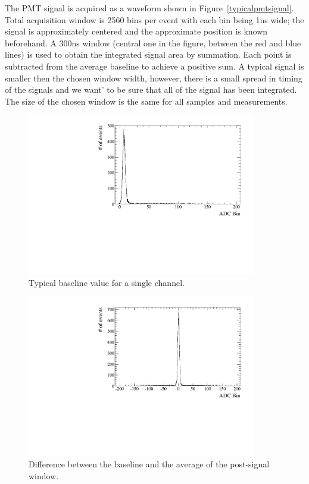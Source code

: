 \documentclass[preprint,12pt]{elsarticle}
\begin{document}
The PMT signal is acquired as a waveform shown in Figure~\ref{typicalpmtsignal}. Total acquisition window is 2560 bins per event with each bin being 1ns wide; the signal is approximately centered and the approximate position is known beforehand. A 300ns window (central one in the figure, between the red and blue lines) is used to obtain the integrated signal area by summation. Each point is subtracted from the average baseline to achieve a positive sum. A typical signal is smaller then the chosen window width, however, there is a small spread in timing of the signals and we want' to be sure that all of the signal has been integrated. The size of the chosen window is the same for all samples and measurements.

\begin{figure}[ht]
\centering
\includegraphics[width=100mm]{baselineitself.pdf}
\caption{Typical baseline value for a single channel.} \label{typicalbaseline}
\end{figure}

\begin{figure}[ht]
\centering
\includegraphics[width=100mm]{baselinedifference.pdf}
\caption{Difference between the baseline and the average of the post-signal window.} \label{baselinedifference}
\end{figure}
\end{document}
